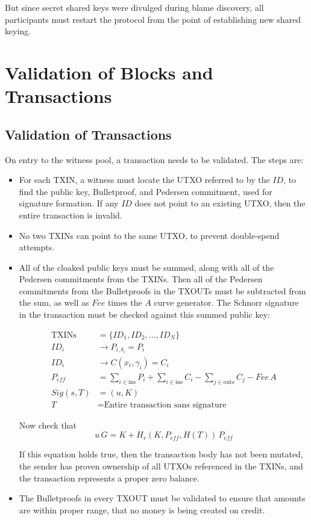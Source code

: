 \documentclass[8pt,fleqn,openany]{book}
\begin{document}
But since secret shared keys were divulged during blame discovery, all participants must restart the protocol from the point of establishing new shared keying.

\chapter{Validation of Blocks and Transactions}\label{app:validation}

\section{Validation of Transactions}
On entry to the witness pool, a transaction needs to be validated. The steps are:

\begin{itemize}
  \item{For each TXIN, a witness must locate the UTXO referred to by the $ID$, to find the public key, Bulletproof, and Pedersen commitment, used for signature formation. If any $ID$ does not point to an existing UTXO, then the entire transaction is invalid.}
  \item{No two TXINs can point to the same UTXO, to prevent double-spend attempts.}
  \item{All of the cloaked public keys must be summed, along with all of the Pedersen commitments from the TXINs. Then all of the Pedersen commitments from the Bulletproofs in the TXOUTs must be subtracted from the sum, as well as $Fee$ times the $A$ curve generator. The Schnorr signature in the transaction must be checked against this summed public key:

  \begin{align*}
    \text{TXINs} &= \{ID_1, ID_2, ..., ID_N\} \\
    ID_i &\rightarrow P_{i, \delta_i} = P_i\\
    ID_i &\rightarrow C(x_i, \gamma_i) = C_i\\
    P_{eff} &= \sum_{i \in \text{ins}}{P_i} + \sum_{i \in \text{ins}}{C_i}  - \sum_{j \in \text{outs}}{C_j} - Fee\,A\\
    Sig(s, T) &= (u, K)\\
    T &= \text{Entire transaction sans signature}
  \end{align*}

  Now check that
  $$u \, G = K + H_r(K, P_{eff}, H(T)) \, P_{eff}$$
  
  If this equation holds true, then the transaction body has not been mutated, the sender has proven ownership of all UTXOs referenced in the TXINs, and the transaction represents a proper zero balance.}
  \item{The Bulletproofs in every TXOUT must be validated to ensure that amounts are within proper range, that no money is being created on credit.}
\end{itemize}
\end{document}
